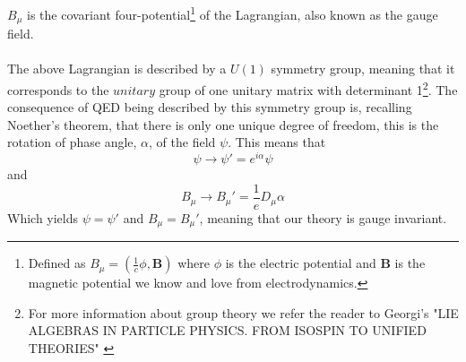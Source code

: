 \documentclass[12pt, a4paper]{book}
\begin{document}
$B_\mu$ is the covariant four-potential\footnote{Defined as $B_\mu = (\frac{1}{c}\phi, \mathbf{B})$ where $\phi$ is the electric potential and $\mathbf{B}$ is the magnetic potential we know and love from electrodynamics. } of the Lagrangian, also known as the gauge field.\\ 
\\The above Lagrangian is described by a $U(1)$ symmetry group, meaning that it corresponds to the $unitary$ group of one unitary matrix with determinant 1\footnote{For more information about group theory we refer the reader to Georgi's "LIE ALGEBRAS IN PARTICLE PHYSICS. FROM ISOSPIN TO UNIFIED THEORIES" \cite{Georgi:1982jb}}. 
The consequence of QED being described by this symmetry group is, recalling Noether's theorem, that there is only one unique degree of freedom, this is the rotation of phase angle, $\alpha$, of the field $\psi$. This means that 
\begin{equation}\label{eq:gauge_psi}
    \psi \rightarrow \psi' = e^{i\alpha}\psi
\end{equation}
and 
\begin{equation}
    B_\mu \rightarrow B_\mu' = \frac{1}{e}D_\mu\alpha
\end{equation}
Which yields $\psi = \psi'$ and $B_\mu = B_\mu'$, meaning that our theory is gauge invariant.
\end{document}
